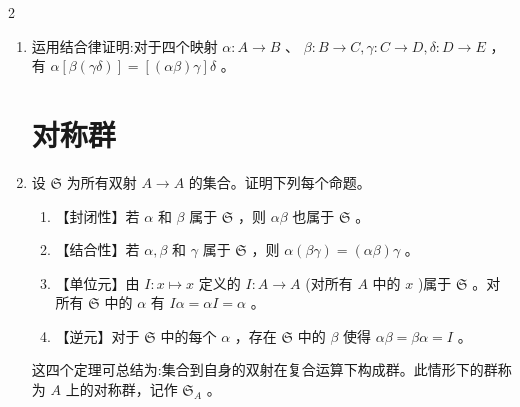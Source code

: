 \documentclass[12pt]{ctexart}
\begin{document}
\begin{multicols}{2}
\begin{enumerate}
\item  运用结合律证明:对于四个映射 \(\alpha  : A \rightarrow  B\) 、 \(\beta  : B \rightarrow  C,\gamma  : C \rightarrow  D,\delta  : D \rightarrow  E\) ，有 \(\alpha \left\lbrack  {\beta \left( {\gamma \delta }\right) }\right\rbrack   = \left\lbrack  {\left( {\alpha \beta }\right) \gamma }\right\rbrack  \delta\) 。

  \section*{对称群}

\item  设 \(\mathfrak{S}\) 为所有双射 \(A \rightarrow  A\) 的集合。证明下列每个命题。
\begin{enumerate}
\item 【封闭性】若 \(\alpha\) 和 \(\beta\) 属于 \(\mathfrak{S}\) ，则 \({\alpha \beta }\) 也属于 \(\mathfrak{S}\) 。

\item 【结合性】若 \(\alpha ,\beta\) 和 \(\gamma\) 属于 \(\mathfrak{S}\) ，则 \(\alpha \left( {\beta \gamma }\right)  = \left( {\alpha \beta }\right) \gamma\) 。

\item  【单位元】由 \(I : x \mapsto  x\) 定义的 \(I : A \rightarrow  A\) (对所有 \(A\) 中的 \(x\) )属于 \(\mathfrak{S}\) 。对所有 \(\mathfrak{S}\) 中的 \(\alpha\) 有 \({I\alpha } = {\alpha I} = \alpha\) 。

\item  【逆元】对于 \(\mathfrak{S}\) 中的每个 \(\alpha\) ，存在 \(\mathfrak{S}\) 中的 \(\beta\) 使得 \({\alpha \beta } = {\beta \alpha } = I\) 。
\end{enumerate}
这四个定理可总结为:集合到自身的双射在复合运算下构成群。此情形下的群称为 \(A\) 上的对称群，记作 \({\mathfrak{S}}_{A}\) 。
\end{enumerate}






\end{multicols} %




\label{LastPage}
\end{document}

